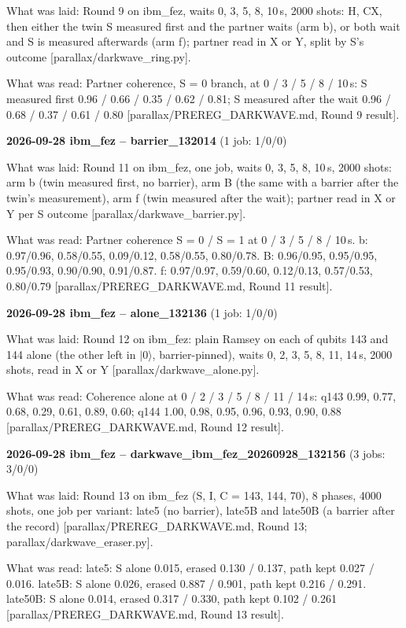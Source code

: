 \documentclass[11pt]{article}
\begin{document}
What was laid: Round 9 on ibm\_fez, waits 0, 3, 5, 8, 10\,\textmu s, 2000 shots: H, CX, then either the twin S measured first and the partner waits (arm b), or both wait and S is measured afterwards (arm f); partner read in X or Y, split by S's outcome {[}parallax/darkwave\_ring.py{]}.

What was read: Partner coherence, S = 0 branch, at 0 / 3 / 5 / 8 / 10\,\textmu s: S measured first 0.96 / 0.66 / 0.35 / 0.62 / 0.81; S measured after the wait 0.96 / 0.68 / 0.37 / 0.61 / 0.80 {[}parallax/PREREG\_DARKWAVE.md, Round 9 result{]}.

\textbf{2026-09-28 ibm\_fez -- barrier\_132014} (1 job: 1/0/0)

What was laid: Round 11 on ibm\_fez, one job, waits 0, 3, 5, 8, 10\,\textmu s, 2000 shots: arm b (twin measured first, no barrier), arm B (the same with a barrier after the twin's measurement), arm f (twin measured after the wait); partner read in X or Y per S outcome {[}parallax/darkwave\_barrier.py{]}.

What was read: Partner coherence S = 0 / S = 1 at 0 / 3 / 5 / 8 / 10\,\textmu s. b: 0.97/0.96, 0.58/0.55, 0.09/0.12, 0.58/0.55, 0.80/0.78. B: 0.96/0.95, 0.95/0.95, 0.95/0.93, 0.90/0.90, 0.91/0.87. f: 0.97/0.97, 0.59/0.60, 0.12/0.13, 0.57/0.53, 0.80/0.79 {[}parallax/PREREG\_DARKWAVE.md, Round 11 result{]}.

\textbf{2026-09-28 ibm\_fez -- alone\_132136} (1 job: 1/0/0)

What was laid: Round 12 on ibm\_fez: plain Ramsey on each of qubits 143 and 144 alone (the other left in \(|0\rangle\), barrier-pinned), waits 0, 2, 3, 5, 8, 11, 14\,\textmu s, 2000 shots, read in X or Y {[}parallax/darkwave\_alone.py{]}.

What was read: Coherence alone at 0 / 2 / 3 / 5 / 8 / 11 / 14\,\textmu s: q143 0.99, 0.77, 0.68, 0.29, 0.61, 0.89, 0.60; q144 1.00, 0.98, 0.95, 0.96, 0.93, 0.90, 0.88 {[}parallax/PREREG\_DARKWAVE.md, Round 12 result{]}.

\textbf{2026-09-28 ibm\_fez -- darkwave\_ibm\_fez\_20260928\_132156} (3 jobs: 3/0/0)

What was laid: Round 13 on ibm\_fez (S, I, C = 143, 144, 70), 8 phases, 4000 shots, one job per variant: late5 (no barrier), late5B and late50B (a barrier after the record) {[}parallax/PREREG\_DARKWAVE.md, Round 13; parallax/darkwave\_eraser.py{]}.

What was read: late5: S alone 0.015, erased 0.130 / 0.137, path kept 0.027 / 0.016. late5B: S alone 0.026, erased 0.887 / 0.901, path kept 0.216 / 0.291. late50B: S alone 0.014, erased 0.317 / 0.330, path kept 0.102 / 0.261 {[}parallax/PREREG\_DARKWAVE.md, Round 13 result{]}.
\end{document}
